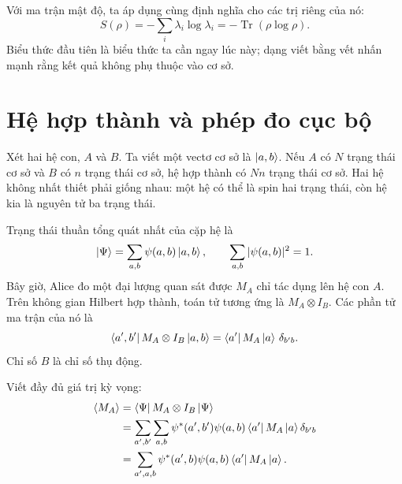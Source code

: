 Với ma trận mật độ, ta áp dụng cùng định nghĩa cho các trị riêng của nó:
\begin{equation}
S(\rho)=-\sum_i\lambda_i\log\lambda_i
=-\operatorname{Tr}(\rho\log\rho).
\end{equation}
Biểu thức đầu tiên là biểu thức ta cần ngay lúc này; dạng viết bằng vết nhấn mạnh rằng kết quả không phụ thuộc vào cơ sở.

\section{Hệ hợp thành và phép đo cục bộ}

Xét hai hệ con, \(A\) và \(B\). Ta viết một vectơ cơ sở là \(\left\lvert a,b\right\rangle\). Nếu \(A\) có \(N\) trạng thái cơ sở và \(B\) có \(n\) trạng thái cơ sở, hệ hợp thành có \(Nn\) trạng thái cơ sở. Hai hệ không nhất thiết phải giống nhau: một hệ có thể là spin hai trạng thái, còn hệ kia là nguyên tử ba trạng thái.

Trạng thái thuần tổng quát nhất của cặp hệ là
\begin{equation}
\left\lvert\Psi\right\rangle
=\sum_{a,b}\psi(a,b)\left\lvert a,b\right\rangle,
\qquad
\sum_{a,b}|\psi(a,b)|^2=1.
\end{equation}
Bây giờ, Alice đo một đại lượng quan sát được \(M_A\) chỉ tác dụng lên hệ con \(A\). Trên không gian Hilbert hợp thành, toán tử tương ứng là \(M_A\otimes I_B\). Các phần tử ma trận của nó là
\begin{equation}
\left\langle a',b'\right\rvert M_A\otimes I_B\left\lvert a,b\right\rangle
=\left\langle a'\right\rvert M_A\left\lvert a\right\rangle\,\delta_{b'b}.
\end{equation}
Chỉ số \(B\) là chỉ số thụ động.

Viết đầy đủ giá trị kỳ vọng:
\begin{align}
\left\langle M_A\right\rangle
&=\left\langle\Psi\right\rvert M_A\otimes I_B\left\lvert\Psi\right\rangle \\
&=\sum_{a',b'}\sum_{a,b}
\psi^*(a',b')\psi(a,b)
\left\langle a'\right\rvert M_A\left\lvert a\right\rangle\delta_{b'b} \\
&=\sum_{a',a,b}
\psi^*(a',b)\psi(a,b)
\left\langle a'\right\rvert M_A\left\lvert a\right\rangle.
\end{align}

\begin{classroomqa}
\end{classroomqa}

